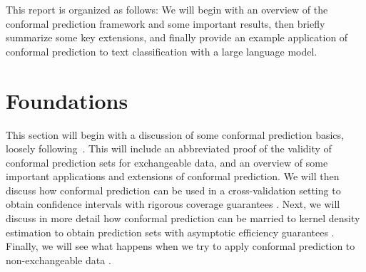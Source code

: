 \documentclass[a4paper, 12pt]{article}
\begin{document}
This report is organized as follows: We will begin with an overview of the conformal prediction framework and some important results, then briefly summarize some key extensions, and finally provide an example application of conformal prediction to text classification with a large language model.

\section{Foundations}
\label{sec:foundations}
This section will begin with a discussion of some conformal prediction basics,
loosely following~\cite{angelopoulosGentleIntroductionConformal2022}.
This will include an abbreviated proof of the validity of conformal prediction sets for exchangeable data,
and an overview of some important applications and extensions of conformal prediction.
We will then discuss how conformal prediction can be used in a cross-validation setting to obtain confidence intervals with rigorous coverage guarantees \autocite{barberPredictiveInferenceJackknife2020}.
Next, we will discuss in more detail how conformal prediction can be married to kernel density estimation to obtain prediction sets with asymptotic efficiency
guarantees \autocite{leiDistributionFreePrediction2013}.
Finally, we will see what happens when we try to apply conformal prediction to
non-exchangeable data \autocite{barberConformalPredictionExchangeability2023}.
\end{document}
